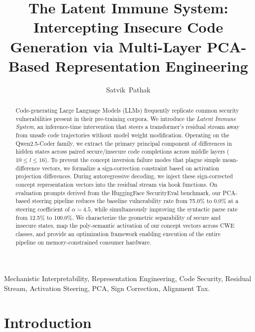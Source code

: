 \documentclass[journal, onecolumn]{IEEEtran}
\begin{document}
\title{The Latent Immune System: Intercepting Insecure Code Generation via Multi-Layer PCA-Based Representation Engineering}

\author{Satvik~Pathak}


\maketitle

\begin{abstract}
Code-generating Large Language Models (LLMs) frequently replicate common security vulnerabilities present in their pre-training corpora. We introduce the \textit{Latent Immune System}, an inference-time intervention that steers a transformer's residual stream away from unsafe code trajectories without model weight modification. Operating on the Qwen2.5-Coder family, we extract the primary principal component of differences in hidden states across paired secure/insecure code completions across middle layers ($10 \le l \le 16$). To prevent the concept inversion failure modes that plague simple mean-difference vectors, we formalize a sign-correction constraint based on activation projection differences. During autoregressive decoding, we inject these sign-corrected concept representation vectors into the residual stream via hook functions. On evaluation prompts derived from the HuggingFace SecurityEval benchmark, our PCA-based steering pipeline reduces the baseline vulnerability rate from 75.0\% to 0.0\% at a steering coefficient of $\alpha = 4.5$, while simultaneously improving the syntactic parse rate from 12.5\% to 100.0\%. We characterize the geometric separability of secure and insecure states, map the poly-semantic activation of our concept vectors across CWE classes, and provide an optimization framework enabling execution of the entire pipeline on memory-constrained consumer hardware.
\end{abstract}

\begin{IEEEkeywords}
Mechanistic Interpretability, Representation Engineering, Code Security, Residual Stream, Activation Steering, PCA, Sign Correction, Alignment Tax.
\end{IEEEkeywords}

\section{Introduction}
\label{sec:intro}
\end{document}
